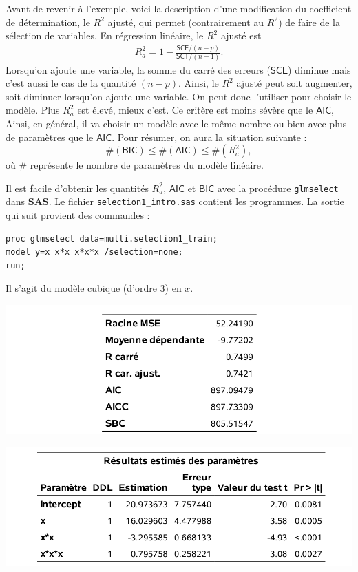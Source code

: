 \documentclass[
  11pt,
  letterpaper,
]{book}
\theoremstyle{definition}
\theoremstyle{definition}
\theoremstyle{definition}
\theoremstyle{remark}
\begin{document}
Avant de revenir à l'exemple, voici la description d'une modification du coefficient de détermination, le \(R^2\) ajusté, qui permet (contrairement au \(R^2\)) de faire de la sélection de variables. En régression linéaire, le \(R^2\) ajusté est
\begin{align*}
R^2_a=1-\frac{\mathsf{SCE}/(n-p)}{\mathsf{SCT}/(n-1)}.
\end{align*}
Lorsqu'on ajoute une variable, la somme du carré des erreurs (\(\mathsf{SCE}\)) diminue mais c'est aussi le cas de la quantité \((n-p)\). Ainsi, le \(R^2\) ajusté peut soit augmenter, soit diminuer lorsqu'on ajoute une variable. On peut donc l'utiliser pour choisir le modèle. Plus \(R^2_a\) est élevé, mieux c'est. Ce critère est moins sévère que le \(\mathsf{AIC}\), Ainsi, en général, il va choisir un modèle avec le même nombre ou bien avec plus de paramètres que le \(\mathsf{AIC}\). Pour résumer, on aura la situation suivante :
\[ \#(\mathsf{BIC}) \leq \#(\mathsf{AIC}) \leq \#(R^2_a),\]
où \(\#\) représente le nombre de paramètres du modèle linéaire.

Il est facile d'obtenir les quantités \(R^2_a\), \(\mathsf{AIC}\) et \(\mathsf{BIC}\) avec la procédure \texttt{glmselect} dans \textbf{SAS}. Le fichier \texttt{selection1\_intro.sas} contient les programmes. La sortie qui suit provient des commandes :

\begin{verbatim}
proc glmselect data=multi.selection1_train;
model y=x x*x x*x*x /selection=none;
run;
\end{verbatim}

Il s'agit du modèle cubique (d'ordre 3) en \(x\).

\begin{center}\includegraphics[width=0.7\linewidth]{figures/02-select-e1} \end{center}

\begin{center}\includegraphics[width=0.7\linewidth]{figures/02-select-e2} \end{center}
\end{document}
